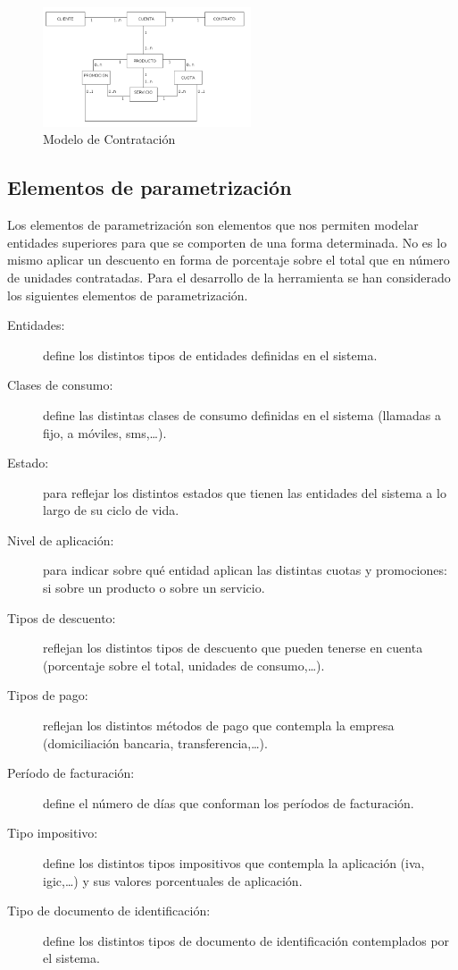 \begin{figure}
  \centering
  \includegraphics[width=0.55\textwidth]{imaxes/instancia.png}
  \caption{Modelo de Contratación}
  \label{fig:contratacion-chap-analisis}
\end{figure}


\subsection{Elementos de parametrización}
\label{sub:parametrizacion-chap-analisis}
Los elementos de parametrización son elementos que nos permiten modelar entidades superiores para que se comporten de una forma determinada. No es lo mismo aplicar un descuento en forma de porcentaje sobre el total que en número de unidades contratadas. Para el desarrollo de la herramienta se han considerado los siguientes elementos de parametrización.
\begin{description}
\item[Entidades:] define los distintos tipos de entidades definidas en el sistema.
\item[Clases de consumo:] define las distintas clases de consumo definidas en el sistema (llamadas a fijo, a móviles, sms,\dots).
\item[Estado:] para reflejar los distintos estados que tienen las entidades del sistema a lo largo de su ciclo de vida.
\item[Nivel de aplicación:] para indicar sobre qué entidad aplican las distintas cuotas y promociones: si sobre un producto o sobre un servicio.
\item[Tipos de descuento:] reflejan los distintos tipos de descuento que pueden tenerse en cuenta (porcentaje sobre el total, unidades de consumo,\dots).
\item[Tipos de pago:] reflejan los distintos métodos de pago que contempla la empresa (domiciliación bancaria, transferencia,\dots).
\item[Período de facturación:] define el número de días que conforman los  períodos de facturación.
\item[Tipo impositivo:] define los distintos tipos impositivos que contempla la aplicación (iva, igic,\dots) y sus valores porcentuales de aplicación.
\item[Tipo de documento de identificación:] define los distintos tipos de documento de identificación contemplados por el sistema.
\end{description}




